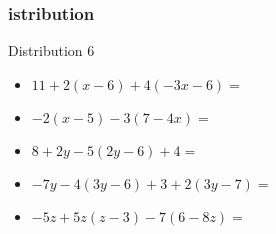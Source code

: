 \documentclass{beamer}
\begin{document}
\begin{frame}
  \frametitle{istribution}
  \begin{exampleblock}{Distribution 6}
    \begin{itemize}
    \item $ 11 + 2(x - 6) + 4(- 3x - 6)        = $
    \item $ -2(x - 5) - 3(7 - 4x)              = $
    \item $ 8 + 2y - 5(2y - 6) + 4             = $
    \item $ -7y - 4(3y - 6) + 3 + 2(3y - 7)    = $   
    \item $ -5z + 5z(z - 3) - 7(6 - 8z)        = $    
    \end{itemize}
  \end{exampleblock}
\end{frame}
\end{document}
